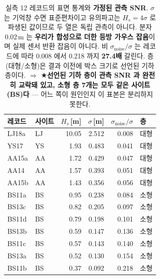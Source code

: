 \begin{table}[htbp]
\centering
\small
\caption{실측 12 레코드의 표면 통계와 \textbf{가정된 관측 SNR}.
$\sigma$ 는 기억창 수면 표준편차이고 유의파고는 $H_s = 4\sigma$ 로 파생된 값이므로
두 열은 독립 관측이 아니다. 분자 0.02\,m 는 \textbf{우리가 합성으로 더한
등방 가우스 잡음}이며 실제 센서 반환 잡음이 아니다.
비 $\sigma_\text{noise}/\sigma$ 는 레코드에 따라
0.008 에서 0.218 까지 \textbf{27.4배} 갈린다.
층(대형/소형)은 결과 이전에 박스 크기로 선언된 기하 층이다.
$\Rightarrow$ ★\textbf{선언된 기하 층이 관측 SNR 과 완전히 교락돼 있고,
소형 층 7개는 모두 같은 사이트(BS)다} --- 어느 쪽이 원인인지 이 표본은 분리하지 못한다.}
\label{tab:real_noise_ratio}
\begin{tabular}{llrrrl}
\toprule
레코드 & 사이트 & $H_s$\,[m] & $\sigma$\,[m] & $\sigma_\text{noise}/\sigma$ & 층 \\
\midrule
LJ18a & LJ & 10.05 & 2.512 & 0.008 & 대형 \\
YS17 & YS & 1.93 & 0.483 & 0.041 & 대형 \\
AA15a & AA & 1.72 & 0.429 & 0.047 & 대형 \\
AA14 & AA & 1.57 & 0.393 & 0.051 & 대형 \\
AA15b & AA & 1.43 & 0.356 & 0.056 & 대형 \\
BS11a & BS & 0.95 & 0.238 & 0.084 & 소형 \\
BS13c & BS & 0.82 & 0.205 & 0.097 & 소형 \\
BS11d & BS & 0.79 & 0.198 & 0.101 & 소형 \\
BS13b & BS & 0.59 & 0.147 & 0.136 & 소형 \\
BS11c & BS & 0.57 & 0.143 & 0.140 & 소형 \\
BS13a & BS & 0.52 & 0.130 & 0.154 & 소형 \\
BS11b & BS & 0.37 & 0.092 & 0.218 & 소형 \\
\bottomrule
\end{tabular}
\end{table}
